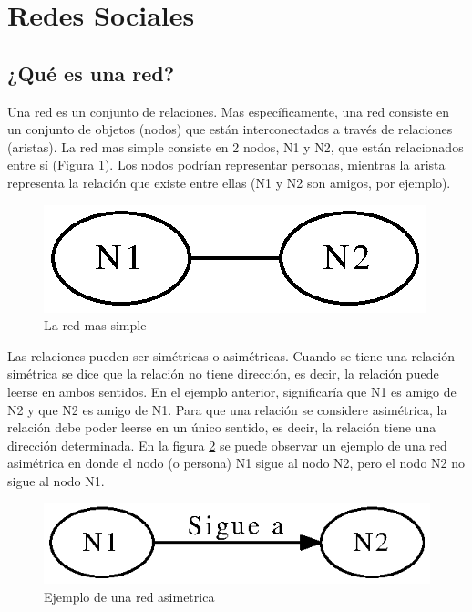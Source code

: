 \section{Redes Sociales}

\subsection{¿Qué es una red?}

Una red es un conjunto de relaciones. Mas específicamente, una red consiste en un conjunto de objetos (nodos) que están interconectados a través de relaciones (aristas). La red mas simple consiste en 2 nodos, N1 y N2, que están relacionados entre sí (Figura \ref{fig:simple}). Los nodos podrían representar personas, mientras la arista representa la relación que existe entre ellas (N1 y N2 son amigos, por ejemplo).

\begin{figure}[!htb]
  \begin{center}
    \includegraphics{./imagenes/Red_simple.eps}
    \caption{La red mas simple}
    \label{fig:simple}
  \end{center}
\end{figure}

Las relaciones pueden ser simétricas o asimétricas. Cuando se tiene una relación simétrica se dice que la relación no tiene dirección, es decir, la relación puede leerse en ambos sentidos. En el ejemplo anterior, significaría que N1 es amigo de N2 y que N2 es amigo de N1. Para que una relación se considere asimétrica, la relación debe poder leerse en un único sentido, es decir, la relación tiene una dirección determinada. En la figura \ref{fig:asimetrica} se puede observar un ejemplo de una red asimétrica en donde el nodo (o persona) N1 sigue al nodo N2, pero el nodo N2 no sigue al nodo N1.

\begin{figure}[!htb]
  \begin{center}
    \includegraphics{./imagenes/Red_asimetrica.eps}
    \caption{Ejemplo de una red asimetrica}
    \label{fig:asimetrica}
  \end{center}
\end{figure}


